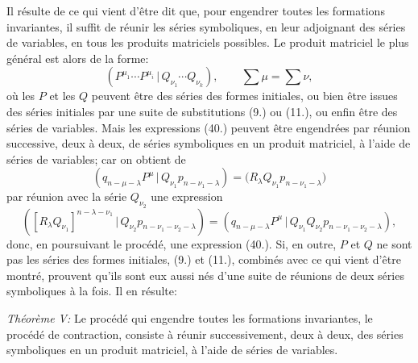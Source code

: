 \documentclass[11pt]{article}
\newcommand{\pair}[2]{(#1\,|\,#2)}
\begin{document}
Il résulte de ce qui vient d'être dit que, pour engendrer toutes les formations invariantes, il suffit de réunir les séries symboliques, en leur adjoignant des séries de variables, en tous les produits matriciels possibles. Le produit matriciel le plus général est alors de la forme:
\begin{equation}
 \pair{P^{\mu_1}\cdots P^{\mu_i}}{Q_{\nu_1}\cdots Q_{\nu_k}},\qquad \sum\mu=\sum\nu,
\tag{40}
\end{equation}
où les $P$ et les $Q$ peuvent être des séries des formes initiales, ou bien être issues des séries initiales par une suite de substitutions (9.) ou (11.), ou enfin être des séries de variables. Mais les expressions (40.) peuvent être engendrées par réunion successive, deux à deux, de séries symboliques en un produit matriciel, à l'aide de séries de variables; car on obtient de
\[
 \pair{q_{n-\mu-\lambda}P^\mu}{Q_{\nu_1}p_{n-\nu_1-\lambda}}=\bigl(R_\lambda Q_{\nu_1}p_{n-\nu_1-\lambda}\bigr)
\]
par réunion avec la série $Q_{\nu_2}$ une expression
\[
 \pair{[R_\lambda Q_{\nu_1}]^{n-\lambda-\nu_1}}{Q_{\nu_2}p_{n-\nu_1-\nu_2-\lambda}}
 =\pair{q_{n-\mu-\lambda}P^\mu}{Q_{\nu_1}Q_{\nu_2}p_{n-\nu_1-\nu_2-\lambda}},
\]
donc, en poursuivant le procédé, une expression (40.). Si, en outre, $P$ et $Q$ ne sont pas les séries des formes initiales, (9.) et (11.), combinés avec ce qui vient d'être montré, prouvent qu'ils sont eux aussi nés d'une suite de réunions de deux séries symboliques à la fois. Il en résulte:

\emph{Théorème V:} Le procédé qui engendre toutes les formations invariantes, le procédé de contraction, consiste à réunir successivement, deux à deux, des séries symboliques en un produit matriciel, à l'aide de séries de variables.
\end{document}
